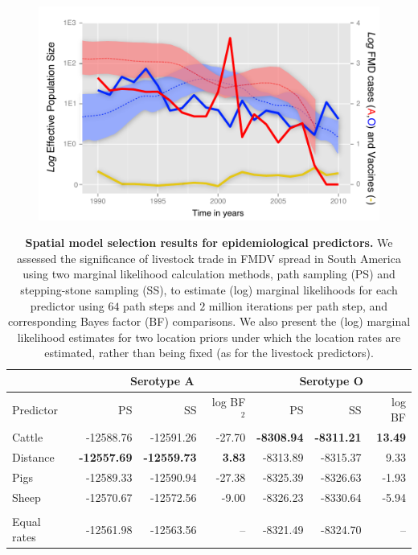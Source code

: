 \documentclass[10pt]{article}
\begin{document}
\newpage
\begin{figure}[H]
\begin{center}
\includegraphics[scale=1.0]{FIGURES/skyride.pdf}
\end{center}
\caption{}
\label{fig:skyride}
\end{figure}
\newpage
\begin{table}[H]
\caption{
\textbf{Spatial model selection results for epidemiological predictors.}
We assessed the significance of livestock trade in FMDV spread in South America using two marginal likelihood calculation methods, path sampling (PS) and stepping-stone sampling (SS), to estimate (log) marginal likelihoods for each predictor using $64$ path steps and $2$ million iterations per path step, and corresponding Bayes factor (BF) comparisons.
We also present the (log) marginal likelihood estimates for two location priors under which the location rates are estimated, rather than being fixed (as for the livestock predictors).
}
\begin{center}
\begin{tabular}{lrrrrrr}
\toprule
 & \multicolumn{3}{c}{Serotype A}& \multicolumn{3}{c}{Serotype O}\\
 \midrule
Predictor & PS & SS & log BF$^2$ & PS & SS & log BF \\
Cattle&-12588.76&-12591.26&-27.70&\textbf{-8308.94}&\textbf{-8311.21}& \textbf{13.49}\\
Distance&\textbf{-12557.69}&\textbf{-12559.73}&\textbf{3.83}&-8313.89&-8315.37&9.33\\
Pigs&-12589.33&-12590.94&-27.38&-8325.39&-8326.63&-1.93\\
Sheep&-12570.67&-12572.56&-9.00&-8326.23&-8330.64&-5.94\\
\\
\hline
Equal rates &-12561.98&-12563.56&--&-8321.49&-8324.70&--\\
\bottomrule
\end{tabular}
\end{center}
\begin{flushleft}
\end{flushleft}
\label{tab:preds}
 \end{table}
\end{document}
